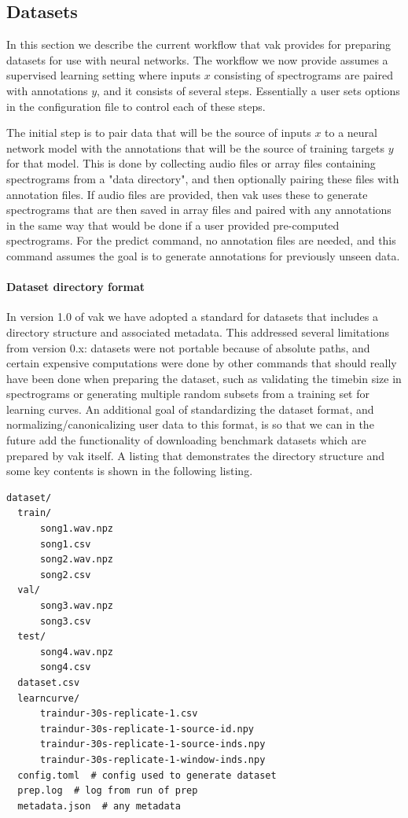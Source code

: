 \subsection{Datasets \label{subsec:datasets}}

In this section we describe the current workflow that vak provides for
preparing datasets for use with neural networks.
The workflow we now provide assumes a supervised learning setting where inputs $x$ consisting of spectrograms are paired with annotations $y$, and it consists of several steps.
Essentially a user sets options in the configuration file to control each of these steps.

The initial step is to pair data that will be the source of
inputs $x$ to a neural network model with the annotations that will be the
source of training targets $y$ for that model.
This is done by collecting audio files or array files containing spectrograms from a "data directory", and then optionally pairing
these files with annotation files.
If audio files are provided, then vak uses these to generate
spectrograms that are then saved in array files and paired with any annotations
in the same way that would be done if a user provided
pre-computed spectrograms.
For the predict command, no annotation files are needed,
and this command assumes the goal is to generate annotations
for previously unseen data.

\paragraph{Dataset directory format}

In version 1.0 of vak we have adopted a standard for datasets
that includes a directory structure and associated metadata.
This addressed several limitations from version 0.x:
datasets were not portable because of absolute paths,
and certain expensive computations were done by other commands
that should really have been done when preparing the dataset,
such as validating the timebin size
in spectrograms or generating multiple random subsets
from a training set for learning curves.
An additional goal of standardizing the dataset format,
and normalizing/canonicalizing user data to this format,
is so that we can in the future add the functionality of
downloading benchmark datasets
which are prepared by vak itself.
A listing that demonstrates the directory structure
and some key contents is shown in the following listing.

\begin{verbatim}
dataset/
  train/
      song1.wav.npz
      song1.csv
      song2.wav.npz
      song2.csv
  val/
      song3.wav.npz
      song3.csv
  test/
      song4.wav.npz
      song4.csv
  dataset.csv
  learncurve/
      traindur-30s-replicate-1.csv
      traindur-30s-replicate-1-source-id.npy
      traindur-30s-replicate-1-source-inds.npy
      traindur-30s-replicate-1-window-inds.npy
  config.toml  # config used to generate dataset
  prep.log  # log from run of prep
  metadata.json  # any metadata
\end{verbatim}

